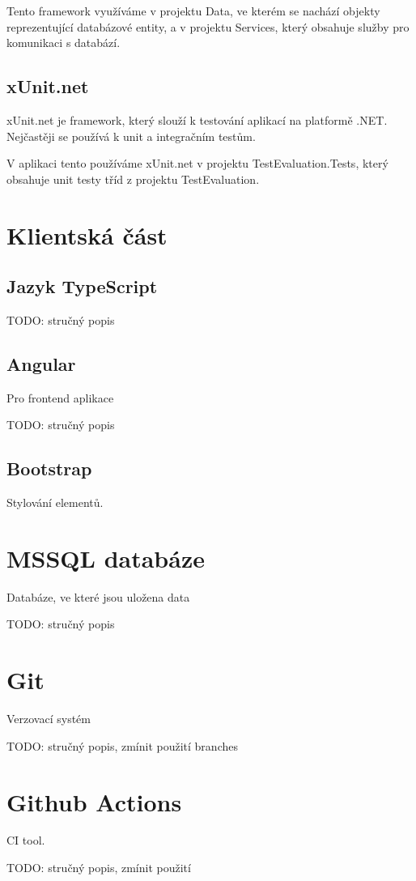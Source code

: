 Tento framework využíváme v projektu Data, ve kterém se nachází objekty reprezentující databázové entity, a v projektu Services, který obsahuje služby pro komunikaci s databází.

\subsection{xUnit.net}
xUnit.net je framework, který slouží k testování aplikací na platformě .NET. Nejčastěji se používá k unit a integračním testům. 
\cite{xUnitDocs}

V aplikaci tento používáme xUnit.net v projektu TestEvaluation.Tests, který obsahuje unit testy tříd z projektu TestEvaluation.

\section{Klientská část}

\subsection{Jazyk TypeScript}
TODO: stručný popis
\cite{TypescriptDocs}

\subsection{Angular}
Pro frontend aplikace
\cite{AngularDocs}

TODO: stručný popis

\subsection{Bootstrap}
Stylování elementů.
\cite{BootstrapDocs}

\section{MSSQL databáze}
Databáze, ve které jsou uložena data
\cite{SqlServerDocs}

TODO: stručný popis

\section{Git}
Verzovací systém
\cite{GitDocs}

TODO: stručný popis, zmínit použití branches

\section{Github Actions}
CI tool.
\cite{GitHubActionsDocs}

TODO: stručný popis, zmínit použití